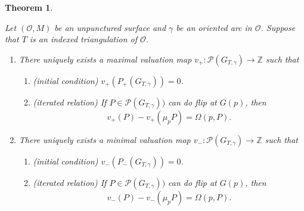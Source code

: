\documentclass[10pt]{amsart}
\theoremstyle{theorems}
\newtheorem{Theorem}{Theorem}[section]
\begin{document}
\begin{Theorem}\label{valumap}

Let $(\mathcal O,M)$ be an unpunctured surface and $\gamma$ be an oriented arc in $\mathcal O$. Suppose that $T$ is an indexed triangulation of $\mathcal O$.

\begin{enumerate}[$(1)$]

\item There uniquely exists a \emph{maximal valuation map} $v_{+}:\mathcal P(G_{T,\gamma})\rightarrow \mathbb Z$ such that

\begin{enumerate}[$(a)$]

  \item (initial condition) $v_{+}(P_{+}(G_{T,\gamma}))=0$.

  \item (iterated relation) If $P\in \mathcal P(G_{T,\gamma}))$ can do flip at $G(p)$, then $$v_{+}(P)-v_{+}(\mu_pP)=\Omega(p,P).$$

\end{enumerate}

\item There uniquely exists a \emph{minimal valuation map} $v_{-}:\mathcal P(G_{T,\gamma})\rightarrow \mathbb Z$ such that

\begin{enumerate}[$(a)$]

  \item (initial condition) $v_{-}(P_{-}(G_{T,\gamma}))=0$.

  \item (iterated relation) If $P\in \mathcal P(G_{T,\gamma}))$ can do flip at $G(p)$, then $$v_{-}(P)-v_{-}(\mu_pP)=\Omega(p,P).$$

\end{enumerate}

\end{enumerate}

\end{Theorem}
\end{document}
